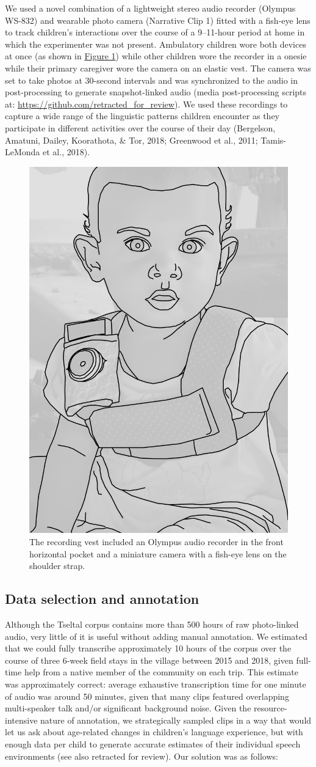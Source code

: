 \documentclass[floatsintext,man]{apa6}
\theoremstyle{definition}
\theoremstyle{definition}
\theoremstyle{definition}
\theoremstyle{remark}
\begin{document}
We used a novel combination of a lightweight stereo audio recorder
(Olympus WS-832) and wearable photo camera (Narrative Clip 1) fitted
with a fish-eye lens to track children's interactions over the course of
a 9--11-hour period at home in which the experimenter was not present.
Ambulatory children wore both devices at once (as shown in
\protect\hyperlink{fig1}{Figure 1}) while other children wore the
recorder in a onesie while their primary caregiver wore the camera on an
elastic vest. The camera was set to take photos at 30-second intervals
and was synchronized to the audio in post-processing to generate
snapshot-linked audio (media post-processing scripts at:
\url{https://github.com/retracted_for_review}). We used these recordings
to capture a wide range of the linguistic patterns children encounter as
they participate in different activities over the course of their day
(Bergelson, Amatuni, Dailey, Koorathota, \& Tor, 2018; Greenwood et al.,
2011; Tamis-LeMonda et al., 2018).

\begin{figure}

{\centering \includegraphics[width=0.3\linewidth]{Tseltal-CLE_files/TseltalCLE-RecordingVest} 

}

\caption{The recording vest included an Olympus audio recorder in the front horizontal pocket and a miniature camera with a fish-eye lens on the shoulder strap.}\label{fig:fig1}
\end{figure}

\subsection{Data selection and annotation}\label{methods-samples}

Although the Tseltal corpus contains more than 500 hours of raw
photo-linked audio, very little of it is useful without adding manual
annotation. We estimated that we could fully transcribe approximately 10
hours of the corpus over the course of three 6-week field stays in the
village between 2015 and 2018, given full-time help from a native member
of the community on each trip. This estimate was approximately correct:
average exhaustive transcription time for one minute of audio was around
50 minutes, given that many clips featured overlapping multi-speaker
talk and/or significant background noise. Given the resource-intensive
nature of annotation, we strategically sampled clips in a way that would
let us ask about age-related changes in children's language experience,
but with enough data per child to generate accurate estimates of their
individual speech environments (see also retracted for review). Our
solution was as follows:
\end{document}
